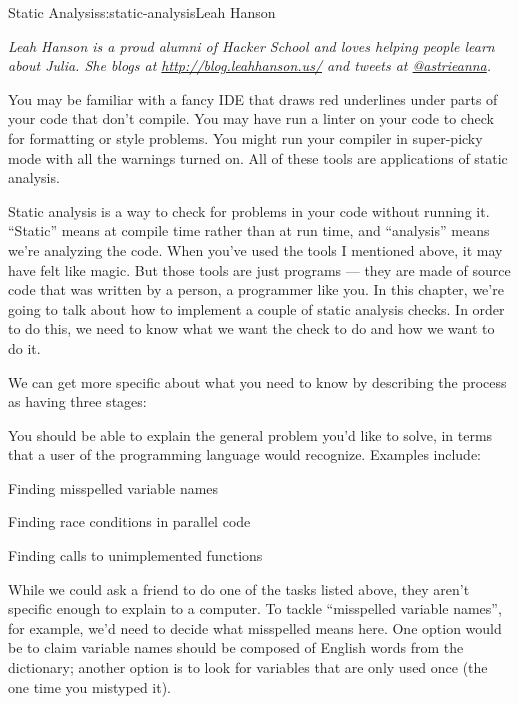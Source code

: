 \begin{aosachapter}{Static Analysis}{s:static-analysis}{Leah Hanson}

\emph{Leah Hanson is a proud alumni of Hacker School and loves helping
people learn about Julia. She blogs at \url{http://blog.leahhanson.us/}
and tweets at \href{https://twitter.com/astrieanna}{@astrieanna}.}

\label{introduction}

You may be familiar with a fancy IDE that draws red underlines under
parts of your code that don't compile. You may have run a linter on your
code to check for formatting or style problems. You might run your
compiler in super-picky mode with all the warnings turned on. All of
these tools are applications of static analysis.

Static analysis is a way to check for problems in your code without
running it. ``Static'' means at compile time rather than at run time,
and ``analysis'' means we're analyzing the code. When you've used the
tools I mentioned above, it may have felt like magic. But those tools
are just programs --- they are made of source code that was written by a
person, a programmer like you. In this chapter, we're going to talk
about how to implement a couple of static analysis checks. In order to
do this, we need to know what we want the check to do and how we want to
do it.

We can get more specific about what you need to know by describing the
process as having three stages:

\label{deciding-what-you-want-to-check-for.}

You should be able to explain the general problem you'd like to solve,
in terms that a user of the programming language would recognize.
Examples include:

\begin{aosaitemize}

\item
  Finding misspelled variable names
\item
  Finding race conditions in parallel code
\item
  Finding calls to unimplemented functions
\end{aosaitemize}

\label{deciding-how-exactly-to-check-for-it.}

While we could ask a friend to do one of the tasks listed above, they
aren't specific enough to explain to a computer. To tackle ``misspelled
variable names'', for example, we'd need to decide what misspelled means
here. One option would be to claim variable names should be composed of
English words from the dictionary; another option is to look for
variables that are only used once (the one time you mistyped it).


\end{aosachapter}
